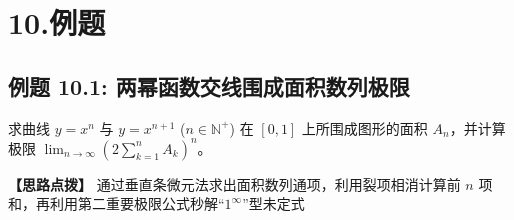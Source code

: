 \documentclass[11pt,a4paper,UTF8]{ctexart}
\begin{document}
\pagestyle{fancy}
\fancyhf{}
\fancyhead[R]{\small\color{TitlePurple}\nouppercase{\leftmark}}
\renewcommand{\headrulewidth}{0.5pt}

\tableofcontents
\newpage
{}


\section{10.例题}


\subsection{例题 10.1: 两幂函数交线围成面积数列极限}

求曲线 $y = x^n$ 与 $y = x^{n+1}$ ($n \in \mathbb{N}^+$) 在 $[0, 1]$ 上所围成图形的面积 $A_n$，并计算极限 $\lim_{n \to \infty} \left(2\sum_{k=1}^n A_k\right)^n$。

\textbf{\color{DeepPurple}【思路点拨】} 通过垂直条微元法求出面积数列通项，利用裂项相消计算前 $n$ 项和，再利用第二重要极限公式秒解“$1^\infty$”型未定式
\end{document}
